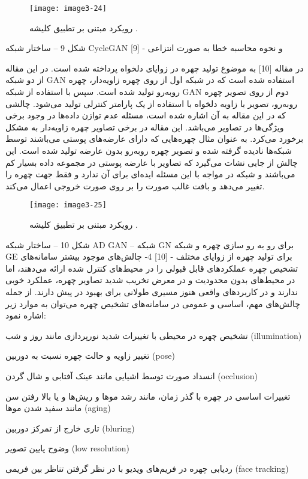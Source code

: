  \begin{figure}[h]
\centering
  \texttt{[image: image3-24]}
  \caption{رویکرد مبتنی بر تطبیق کلیشه  \cite{ref1}.}
  \label{image3-24}
\end{figure} 
شکل 9 – ساختار شبکه CycleGAN و نحوه محاسبه خطا به صورت انتزاعی - [9]

در مقاله [10] به موضوع تولید چهره در زوایای دلخواه پرداخته شده است. در این مقاله از دو شبکه GAN استفاده شده است که در شبکه اول از روی چهره زاویه‌دار، چهره روبه‌رو تولید شده است. سپس با استفاده از شبکه GAN دوم از روی تصویر چهره روبه‌رو، تصویر با زاویه دلخواه با استفاده از یک پارامتر کنترلی تولید می‌شود. 
چالشی که در این مقاله به آن اشاره شده است، مسئله عدم توازن داده‌ها در وجود برخی ویژگی‌ها در تصاویر می‌باشد. این مقاله در برخی تصاویر چهره زاویه‌دار به مشکل برخورد می‌کرد. به عنوان مثال چهره‌هایی که دارای عارضه‌های پوستی می‌باشند توسط شبکه‌ها نادیده گرفته شده و تصویر چهره روبه‌رو بدون عارضه تولید شده است. این چالش از جایی نشات می‌گیرد که تصاویر با عارضه پوستی در مجموعه داده بسیار کم می‌باشند و شبکه در مواجه با این مسئله ایده‌ای برای آن ندارد و فقط جهت چهره را تغییر می‌دهد و بافت غالب صورت را بر روی صورت خروجی اعمال می‌کند. 

 
  \begin{figure}[h]
\centering
  \texttt{[image: image3-25]}
  \caption{رویکرد مبتنی بر تطبیق کلیشه  \cite{ref1}.}
  \label{image3-25}
\end{figure}
شکل 10 – ساختار شبکه AD GAN – شبکه GN برای رو به رو سازی چهره و شبکه GE برای تولید چهره از زوایای مختلف - [10]
4-	چالش‌های موجود
بیشتر سامانه‌های تشخیص چهره عملکردهای قابل قبولی را در محیط‌های کنترل شده ارائه می‌دهند، اما در محیط‌های بدون محدودیت و در معرض تخریب شدید تصاویر چهره، عملکرد خوبی ندارند و در کاربردهای واقعی هنوز مسیری طولانی برای بهبود در پیش دارند. از جمله چالش‌های مهم، اساسی و عمومی در سامانه‌های تشخیص چهره می‌توان به موارد زیر اشاره نمود:

تشخیص چهره در محیطی با تغییرات شدید نورپردازی مانند روز و شب (illumination)

تغییر زاویه و حالت چهره نسبت به دوربین (pose)

انسداد صورت توسط اشیایی مانند عینک آفتابی و شال گردن (occlusion)

تغییرات اساسی در چهره با گذر زمان، مانند رشد موها و ریش‌ها و یا بالا رفتن سن مانند سفید شدن موها (aging)

تاری خارج از تمرکز دوربین (bluring)

وضوح پایین تصویر (low resolution)

ردیابی چهره در فریم‌های ویدیو با در نظر گرفتن تناظر بین فریمی (face tracking)


